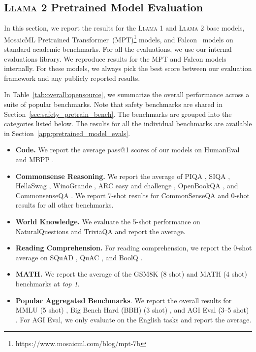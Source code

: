 \subsection{\textsc{Llama 2} Pretrained Model Evaluation} \label{sec:pretraining_eval}

In this section, we report the results for the \textsc{Llama 1} and \textsc{Llama 2} base models, MosaicML Pretrained Transformer~(MPT)\footnote{https://www.mosaicml.com/blog/mpt-7b} models, and Falcon~\citep{falcon40b} models  on standard academic benchmarks. For all the evaluations, we use our internal evaluations library. We reproduce results for the MPT and Falcon models internally. For these models, we always pick the best score between our evaluation framework and any publicly reported results. 

In Table~\ref{tab:overall:opensource}, we summarize the overall performance across a suite of popular benchmarks. Note that safety benchmarks are shared in Section~\ref{sec:safety_pretrain_bench}. The benchmarks are grouped into the categories listed below. The results for all the individual benchmarks are available in Section~\ref{app:pretrained_model_evals}.

\begin{itemize}
    \item \textbf{Code.} We report the average pass@1 scores of our models on HumanEval \citep{chen2021Evaluating} and MBPP \citep{austin2021program}. 
    \item \textbf{Commonsense Reasoning.} We report the average of PIQA \citep{bisk2020piqa}, SIQA \citep{sap2019socialiqa}, HellaSwag \citep{zellers2019hellaswag}, WinoGrande \citep{sakaguchi2021winogrande}, ARC easy and challenge \citep{clark2018think}, OpenBookQA \citep{mihaylov2018can}, and CommonsenseQA \citep{talmor2018commonsenseqa}. We report 7-shot results for CommonSenseQA and 0-shot results for all other benchmarks. 
    \item \textbf{World Knowledge.} We evaluate the 5-shot performance on NaturalQuestions \citep{kwiatkowski2019natural} and TriviaQA \citep{joshi2017triviaqa} and report the average.
    \item \textbf{Reading Comprehension.} For reading comprehension, we report the 0-shot average on SQuAD \citep{rajpurkar2018know}, QuAC \citep{choi2018quac}, and BoolQ \citep{clark2019boolq}.
    \item \textbf{MATH.} We report the average of the GSM8K (8 shot) \citep{cobbe2021training} and MATH (4 shot) \citep{hendrycks2021measuring} benchmarks at \textit{top 1}.
    \item \textbf{Popular Aggregated Benchmarks}. We report the overall results for MMLU (5 shot) \citep{Hendrycks2020MeasuringMM}, Big Bench Hard (BBH) (3 shot) \citep{suzgun2022challenging}, and AGI Eval (3--5 shot) \citep{zhong2023agieval}. For AGI Eval, we only evaluate on the English tasks and report the average. 
\end{itemize}

